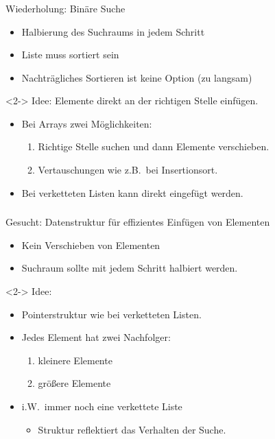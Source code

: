 

\begin{frame}
\frametitle{\insertsection}
\begin{block}
{Wiederholung: Binäre Suche}
\begin{itemize}
	\item[\positive] Halbierung des Suchraums in jedem Schritt
	\item[\negative] Liste muss sortiert sein
	\item[\negative] Nachträgliches Sortieren ist keine Option (\alert{zu langsam})
\end{itemize}
\end{block}
\begin{block}<2->
{Idee: Elemente direkt an der richtigen Stelle einfügen.}
\begin{itemize}
	\item Bei Arrays zwei Möglichkeiten:
		\begin{enumerate}
			\item Richtige Stelle suchen und dann Elemente verschieben.
			\item Vertauschungen wie z.B.\ bei Insertionsort.
		\end{enumerate}
	\item Bei verketteten Listen kann direkt eingefügt werden. 
\end{itemize}
\end{block}
\end{frame}

\begin{frame}
\frametitle{\insertsection}
\begin{block}
{Gesucht: Datenstruktur für effizientes Einfügen von Elementen}
\begin{itemize}
	\item Kein Verschieben von Elementen
	\item Suchraum sollte mit jedem Schritt halbiert werden.
\end{itemize}
\end{block}
\begin{block}<2->
{Idee:}
\begin{itemize}
	\item Pointerstruktur wie bei verketteten Listen.
	\item Jedes Element hat zwei Nachfolger:
		\begin{enumerate}
			\item kleinere Elemente
			\item größere Elemente
		\end{enumerate}
	\item i.W.\ immer noch eine verkettete Liste
		\begin{itemize}
			\item Struktur reflektiert das Verhalten der Suche.
		\end{itemize}
\end{itemize}
\end{block}
\end{frame}

